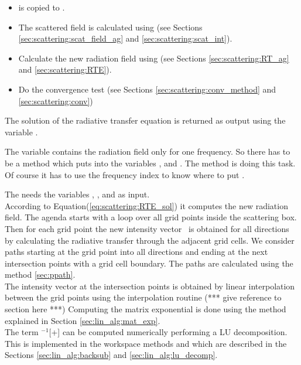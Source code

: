 \begin{itemize}
\item {} is copied to .
\item The scattered field is calculated using
    (see Sections \ref{sec:scattering:scat_field_ag} and
    \ref{sec:scattering:scat_int}).
\item Calculate the new radiation field using
 (see Sections \ref{sec:scattering:RT_ag} and
  \ref{sec:scattering:RTE}).
\item Do the convergence test (see Sections
  \ref{sec:scattering:conv_method} and \ref{sec:scattering:conv})
\end{itemize}
The solution of the radiative transfer equation is returned as output
using the variable . 

The variable  contains the radiation field only
for one frequency. So there has to be a method which puts
 into the variables ,
 and . The method
 is doing this task.
Of course it has to use the frequency index to know where
to put .
 

\label{sec:scattering:scat_field_ag}

\label{sec:scattering:RT_ag}
The  needs the variables
, , 
and   as input.\\ 
According to Equation(\ref{eq:scattering:RTE_sol}) it computes the new
radiation field. The agenda starts with a loop over all grid points
inside the scattering box. Then for each grid point the new intensity
vector
 \StoVec\  is obtained for all directions by calculating the
radiative transfer through the adjacent grid cells. We consider paths
starting at the grid point into all directions and ending at the next
intersection points with a grid cell boundary. The paths are calculated
using the method \ref{sec:ppath}.\\
 The intensity vector at
the intersection points  is obtained by linear interpolation
between the grid points using the interpolation routine (*** give 
reference to section here ***)
Computing the matrix exponential is done using the method
 explained in Section
\ref{sec:lin_alg:mat_exp}.\\
 The term
\ExtMat$^{-1}$[\AbsVec\Planck+\ScaInt] can be computed numerically  
performing a LU decomposition. This is implemented in the workspace
methods  and  which are described
in the Sections \ref{sec:lin_alg:backsub} and
\ref{sec:lin_alg:lu_decomp}. 


